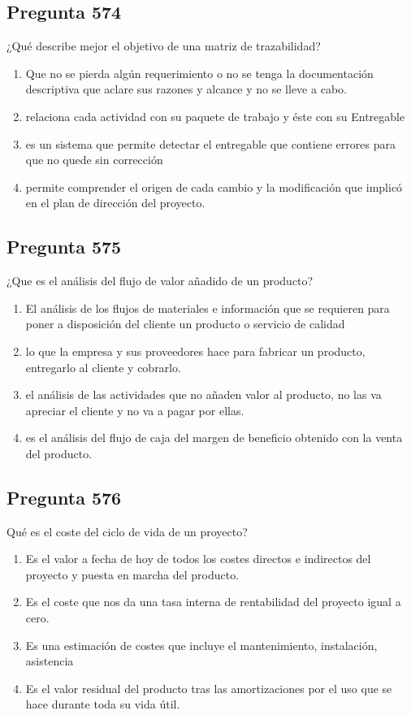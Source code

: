 \documentclass[11pt,a4paper]{article}
\begin{document}
\subsection*{Pregunta 574}
¿Qué describe mejor el objetivo de una matriz de trazabilidad?

\begin{enumerate}[label=\alph*)]
  \item Que no se pierda algún requerimiento o no se tenga la documentación descriptiva que aclare sus razones y alcance y no se lleve a cabo.
  \item relaciona cada actividad con su paquete de trabajo y éste con su Entregable
  \item es un sistema que permite detectar el entregable que contiene errores para que no quede sin corrección
  \item permite comprender el origen de cada cambio y la modificación que implicó en el plan de dirección del proyecto.
\end{enumerate}

\subsection*{Pregunta 575}
¿Que es el análisis del flujo de valor añadido de un producto?

\begin{enumerate}[label=\alph*)]
  \item El análisis de los flujos de materiales e información que se requieren para poner a disposición del cliente un producto o servicio de calidad
  \item lo que la empresa y sus proveedores hace para fabricar un producto, entregarlo al cliente y cobrarlo.
  \item el análisis de las actividades que no añaden valor al producto, no las va apreciar el cliente y no va a pagar por ellas.
  \item es el análisis del flujo de caja del margen de beneficio obtenido con la venta del producto.
\end{enumerate}

\subsection*{Pregunta 576}
Qué es el coste del ciclo de vida de un proyecto?

\begin{enumerate}[label=\alph*)]
  \item Es el valor a fecha de hoy de todos los costes directos e indirectos del proyecto y puesta en marcha del producto.
  \item Es el coste que nos da una tasa interna de rentabilidad del proyecto igual a cero.
  \item Es una estimación de costes que incluye el mantenimiento, instalación, asistencia
  \item Es el valor residual del producto tras las amortizaciones por el uso que se hace durante toda su vida útil.
\end{enumerate}
\end{document}
